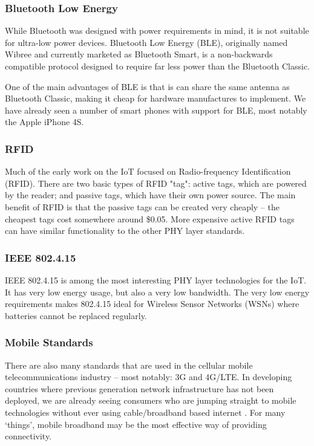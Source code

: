 \documentclass[10pt,journal,compsoc]{IEEEtran}
\begin{document}
\subsubsection{Bluetooth Low Energy}
While Bluetooth was designed with power requirements in mind, it is not
suitable for ultra-low power devices. Bluetooth Low Energy (BLE), originally
named Wibree and currently marketed as Bluetooth Smart, is a non-backwards
compatible protocol designed to require far less power than the Bluetooth
Classic. 

One of the main advantages of BLE is that is can share the same antenna as
Bluetooth Classic, making it cheap for hardware manufactures to implement. We
have already seen a number of smart phones with support for BLE, most notably
the Apple iPhone 4S.

\subsubsection{RFID}
Much of the early work on the IoT focused on Radio-frequency Identification
(RFID). There are two basic types of RFID "tag": active tags, which are powered
by the reader; and passive tags, which have their own power source. The main
benefit of RFID is that the passive tags can be created very cheaply -- the
cheapest tags cost somewhere around \$0.05. More expensive active RFID tags can
have similar functionality to the other PHY layer standards. 

\subsubsection{IEEE 802.4.15}
IEEE 802.4.15 is among the most interesting PHY layer technologies for the IoT. It
has very low energy usage, but also a very low bandwidth. The very low energy
requirements makes 802.4.15 ideal for Wireless Sensor Networks (WSNs) where
batteries cannot be replaced regularly. 

\subsubsection{Mobile Standards}
There are also many standards that are used in the cellular mobile
telecommunications industry -- most notably: 3G and 4G/LTE. In developing
countries where previous generation network infrastructure has not been
deployed, we are already seeing consumers who are jumping straight to mobile
technologies without ever using cable/broadband based internet
\cite{Kritzinger2013}. For many `things', mobile broadband may be the most
effective way of providing connectivity.  
\end{document}
